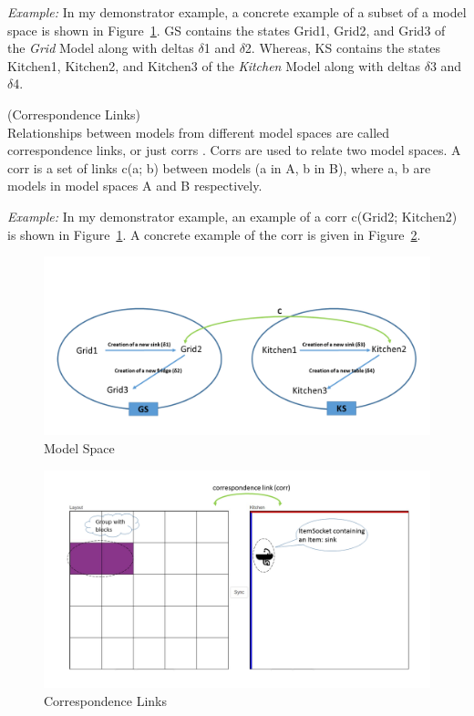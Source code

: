 \textit{Example:} In my demonstrator example, a concrete example of a subset of a model space is shown in Figure~\ref{fig:Model_Space}. GS contains the states Grid1, Grid2, and Grid3 of the \textit{Grid} Model along with deltas $\delta$1 and $\delta$2. Whereas, KS contains the states Kitchen1, Kitchen2, and Kitchen3 of the \textit{Kitchen} Model along with deltas $\delta$3 and $\delta$4.

\begin{defn}\label{defCorrespondenceLinks } (Correspondence Links)\\
Relationships between models from different model spaces are called correspondence links, or just corrs \cite{benchmarx-reload}. Corrs are used to relate two model spaces. A corr is a set of links c(a; b) between models (a in A, b in B), where  a, b are models in model spaces A and B respectively.
\end{defn}

\textit{Example:} In my demonstrator example, an example of a corr c(Grid2; Kitchen2) is shown in Figure~\ref{fig:Model_Space}. A concrete example of the corr is given in  Figure~\ref{fig:Correspondence_Links}.

\begin{figure}
	\centering
	\includegraphics[width=1\textwidth]{figures/Model_Space}
	\caption{Model Space}
	\label{fig:Model_Space}
\end{figure}

\begin{figure}
	\centering
	\includegraphics[width=1\textwidth]{figures/Corr}
	\caption{Correspondence Links}
	\label{fig:Correspondence_Links}
\end{figure}

